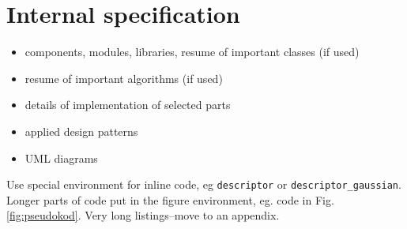 \documentclass[a4paper,twoside,12pt]{book}
\begin{document}

\chapter{Internal specification}

\begin{itemize}
\item components, modules, libraries, resume of important classes (if used)
\item resume of important algorithms (if used)
\item details of implementation of selected parts
\item applied design patterns
\item UML diagrams
\end{itemize}


Use special environment for inline code, eg \lstinline|descriptor| or \lstinline|descriptor_gaussian|. 
Longer parts of code put in the figure environment, eg. code in Fig. \ref{fig:pseudokod}. Very long listings–move to an appendix.

\clearpage

\end{document}
